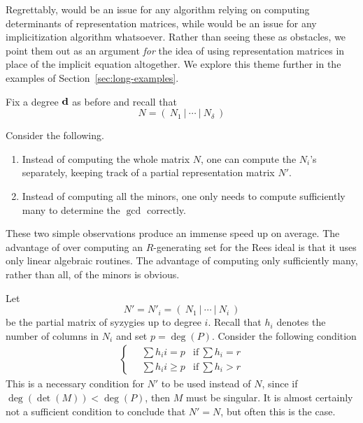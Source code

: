\documentclass[fleqn,reqno]{amsart}
\begin{document}
\begin{paragraf*}
Regrettably,
 would be an issue for any algorithm
relying on computing determinants of representation matrices,
while 
would be an issue for any implicitization algorithm whatsoever.
Rather than seeing these as obstacles,
we point them out as an argument {\em for} the idea of using
representation matrices in place of the implicit equation altogether.
We explore this theme further in the examples of Section~\ref{sec:long-examples}.
\end{paragraf*}

\begin{paragraf}
\label{par:proposed}
Fix a degree $\mathbf d$ as before and recall that
\[
	N=(~N_1~|~\cdots~|~N_\delta~)
\]

Consider the following.
\begin{enumerate}
\item
\label{itm:N'}
Instead of computing the whole matrix $N$, one can compute the $N_i$'s separately,
keeping track of a partial representation matrix $N'$.
\item
\label{itm:gcd}
Instead of computing all the minors, one only needs to compute sufficiently many to determine
the $\gcd$ correctly.
\end{enumerate}
\end{paragraf}

\begin{paragraf*}
These two simple observations produce an immense speed up on average.
The advantage of  over computing an $R$-generating set for the
Rees ideal is that it uses only linear algebraic routines.
The advantage of computing only sufficiently many, rather than all, of the minors is obvious.
\end{paragraf*}

\begin{paragraf}
Let
\[
	N'=N'_i=(~N_1~|~\cdots~|~N_i~)
\]
be the partial matrix of syzygies up to degree $i$.
Recall that $h_i$ denotes the number of columns in $N_i$
and set $p=\deg(P)$.
Consider the following condition
\begin{align}
	\label{C:matrix}
	\tag{C1}
	\begin{cases}
		\quad\sum h_ii=p &\text{if}~\sum h_i=r\\
		\quad\sum h_ii\geq p&\text{if}~\sum h_i>r
	\end{cases}
\end{align}
This is a necessary condition for $N'$ to be used instead of $N$,
since if $\deg(\det(M))<\deg(P)$, then $M$ must be singular.
It is almost certainly not a sufficient condition to conclude that $N'=N$,
but often this is the case.
\end{paragraf}
\end{document}
